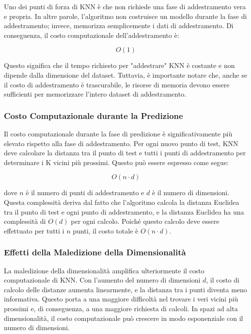 Uno dei punti di forza di KNN è che non richiede una fase di addestramento vera e propria. In altre parole, l'algoritmo non costruisce un modello durante la fase di addestramento; invece, memorizza semplicemente i dati di addestramento. Di conseguenza, il costo computazionale dell'addestramento è:

\begin{equation}
O(1)
\end{equation}

Questo significa che il tempo richiesto per "addestrare" KNN è costante e non dipende dalla dimensione del dataset. Tuttavia, è importante notare che, anche se il costo di addestramento è trascurabile, le risorse di memoria devono essere sufficienti per memorizzare l'intero dataset di addestramento.

\subsubsection{Costo Computazionale durante la Predizione}

Il costo computazionale durante la fase di predizione è significativamente più elevato rispetto alla fase di addestramento. Per ogni nuovo punto di test, KNN deve calcolare la distanza tra il punto di test e tutti i punti di addestramento per determinare i K vicini più prossimi. Questo può essere espresso come segue:

\begin{equation}
O(n \cdot d)
\end{equation}

dove \( n \) è il numero di punti di addestramento e \( d \) è il numero di dimensioni. Questa complessità deriva dal fatto che l'algoritmo calcola la distanza Euclidea tra il punto di test e ogni punto di addestramento, e la distanza Euclidea ha una complessità di \( O(d) \) per ogni calcolo. Poiché questo calcolo deve essere effettuato per tutti i \( n \) punti, il costo totale è \( O(n \cdot d) \).

\subsubsection{Effetti della Maledizione della Dimensionalità}

La maledizione della dimensionalità amplifica ulteriormente il costo computazionale di KNN. Con l'aumento del numero di dimensioni \( d \), il costo di calcolo delle distanze aumenta linearmente, e la distanza tra i punti diventa meno informativa. Questo porta a una maggiore difficoltà nel trovare i veri vicini più prossimi e, di conseguenza, a una maggiore richiesta di calcoli. In spazi ad alta dimensionalità, il costo computazionale può crescere in modo esponenziale con il numero di dimensioni.

